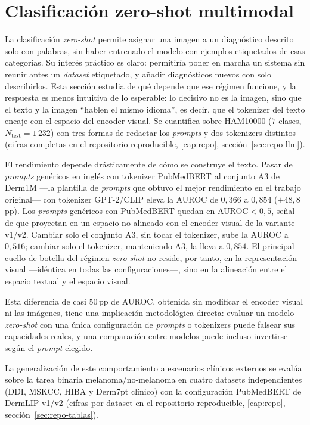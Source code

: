 \section{Clasificación zero-shot multimodal}
\label{sec:zs-results}

La clasificación \emph{zero-shot} permite asignar una imagen a un
diagnóstico descrito solo con palabras, sin haber entrenado el modelo
con ejemplos etiquetados de esas categorías. Su interés práctico es
claro: permitiría poner en marcha un sistema sin reunir antes un
\emph{dataset} etiquetado, y añadir diagnósticos nuevos con solo
describirlos. Esta sección estudia de qué depende que ese régimen
funcione, y la respuesta es menos intuitiva de lo esperable: lo
decisivo no es la imagen, sino que el texto y la imagen ``hablen el
mismo idioma'', es decir, que el tokenizer del texto encaje con
el espacio del encoder visual. Se cuantifica sobre HAM10000
($7$ clases, $N_{\mathrm{test}} = 1\,232$) con tres formas de redactar
los \emph{prompts} y dos tokenizers distintos (cifras completas
en el repositorio reproducible, \ref{cap:repo},
sección~\ref{sec:repo-llm}).

El rendimiento depende drásticamente de cómo se construye el texto.
Pasar de \emph{prompts} genéricos en inglés con tokenizer
PubMedBERT al conjunto A3 de Derm1M ---la plantilla de \emph{prompts}
que obtuvo el mejor rendimiento en el trabajo original--- con
tokenizer GPT-2/CLIP eleva la AUROC de $0{,}366$ a $0{,}854$
($+48{,}8$\,pp). Los
\emph{prompts} genéricos con PubMedBERT quedan en AUROC$<0{,}5$,
señal de que proyectan en un espacio no alineado con el encoder
visual de la variante v1/v2. Cambiar solo el conjunto A3, sin tocar
el tokenizer, sube la AUROC a $0{,}516$; cambiar solo el
tokenizer, manteniendo A3, la lleva a $0{,}854$. El principal cuello
de botella del régimen \emph{zero-shot} no reside, por tanto, en la
representación visual ---idéntica en todas las configuraciones---,
sino en la alineación entre el espacio textual y el espacio visual.

Esta diferencia de casi $50$\,pp de AUROC, obtenida sin modificar el
encoder visual ni las imágenes, tiene una implicación metodológica
directa: evaluar un modelo \emph{zero-shot} con una única configuración
de \emph{prompts} o tokenizers puede falsear sus capacidades
reales, y una comparación entre modelos puede incluso invertirse según
el \emph{prompt} elegido.

La generalización de este comportamiento a escenarios clínicos
externos se evalúa sobre la tarea binaria melanoma/no-melanoma en
cuatro datasets independientes
(DDI, MSKCC, HIBA y Derm7pt clínico) con la configuración
PubMedBERT de DermLIP v1/v2 (cifras por dataset en el repositorio
reproducible, \ref{cap:repo}, sección~\ref{sec:repo-tablas}).

